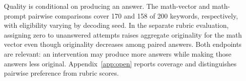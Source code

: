 Quality is conditional on producing an answer. The math-vector and math-prompt pairwise comparisons cover 170 and 158 of 200 keywords, respectively, with eligibility varying by decoding seed. In the separate rubric evaluation, assigning zero to unanswered attempts raises aggregate originality for the math vector even though originality decreases among paired answers. Both endpoints are relevant: an intervention may produce more answers while making those answers less original. Appendix~\ref{app:open} reports coverage and distinguishes pairwise preference from rubric scores.
